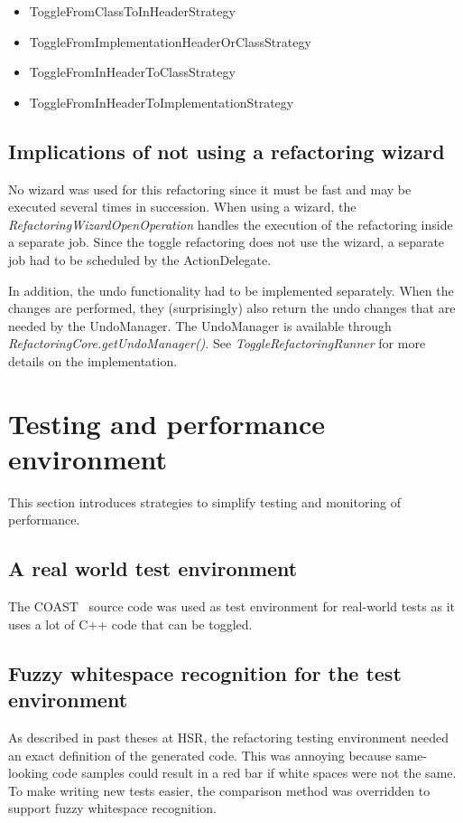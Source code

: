 \begin{itemize}
\item ToggleFromClassToInHeaderStrategy
\item ToggleFromImplementationHeaderOrClassStrategy
\item ToggleFromInHeaderToClassStrategy
\item ToggleFromInHeaderToImplementationStrategy
\end{itemize}

\subsection{Implications of not using a refactoring wizard}
No wizard was used for this refactoring since it must be fast and may be 
executed several times in succession. When using a wizard, the 
\textit{RefactoringWizardOpenOperation} handles the execution of the refactoring 
inside a separate job. Since the toggle refactoring does not use the wizard, a 
separate job had to be scheduled by the ActionDelegate.

In addition, the undo functionality had to be implemented separately. When the 
changes are performed, they (surprisingly) also return the undo changes that are 
needed by the UndoManager. The UndoManager is available through 
\textit{RefactoringCore.getUndoManager()}. See \textit{ToggleRefactoringRunner} 
for more details on the implementation.

\section{Testing and performance environment}

This section introduces strategies to simplify testing and monitoring of 
performance.

\subsection{A real world test environment}
The COAST~\cite{COAST} source code was used as test environment for real-world 
tests as it uses a lot of C++ code that can be toggled.

\subsection[Fuzzy whitespace recognition for the tests]{Fuzzy whitespace 
recognition for the test environment}

As described in past theses at HSR, the refactoring testing environment
needed an exact definition of the generated code. This was annoying because
same-looking code samples could result in a red bar if white spaces were not the
same. To make writing new tests easier, the comparison method was overridden to
support fuzzy whitespace recognition.

